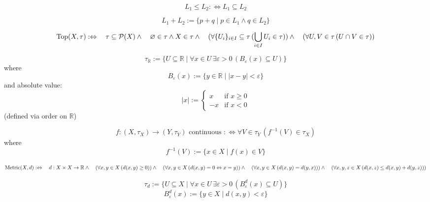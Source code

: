 \documentclass{article}
\begin{document}
\[
L_1 \leq L_2 :\Leftrightarrow L_1 \subseteq L_2
\]

\[
L_1 + L_2 := \{ p + q \mid p \in L_1 \land q \in L_2 \}
\]

\[
\text{Top}(X, \tau) :\Leftrightarrow \\
\quad \tau \subseteq \mathcal{P}(X) \land \\
\quad \varnothing \in \tau \land X \in \tau \land \\
\quad (\forall \{U_i\}_{i \in I} \subseteq \tau \, (\bigcup_{i \in I} U_i \in \tau)) \land \\
\quad (\forall U, V \in \tau \, (U \cap V \in \tau))
\]

\[
\tau_{\mathbb{R}} := \{ U \subseteq \mathbb{R} \mid \forall x \in U \, \exists \varepsilon > 0 \, (B_\varepsilon(x) \subseteq U) \}
\]
where
\[
B_\varepsilon(x) := \{ y \in \mathbb{R} \mid |x - y| < \varepsilon \}
\]
and absolute value:
\[
|x| := \begin{cases}
x & \text{if } x \geq 0 \\
-x & \text{if } x < 0
\end{cases}
\]
(defined via order on $\mathbb{R}$)

\[
f : (X, \tau_X) \to (Y, \tau_Y) \text{ continuous } :\Leftrightarrow \forall V \in \tau_Y \, (f^{-1}(V) \in \tau_X)
\]
where
\[
f^{-1}(V) := \{ x \in X \mid f(x) \in V \}
\]

\[
\text{Metric}(X, d) :\Leftrightarrow \\
\quad d : X \times X \to \mathbb{R} \land \\
\quad (\forall x, y \in X \, (d(x, y) \geq 0)) \land \\
\quad (\forall x, y \in X \, (d(x, y) = 0 \Leftrightarrow x = y)) \land \\
\quad (\forall x, y \in X \, (d(x, y) = d(y, x))) \land \\
\quad (\forall x, y, z \in X \, (d(x, z) \leq d(x, y) + d(y, z)))
\]

\[
\tau_d := \{ U \subseteq X \mid \forall x \in U \, \exists \varepsilon > 0 \, (B_\varepsilon^d(x) \subseteq U) \}
\]
\[
B_\varepsilon^d(x) := \{ y \in X \mid d(x, y) < \varepsilon \}
\]

\end{document}
